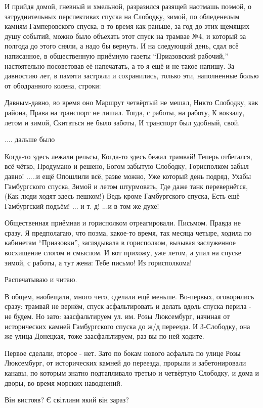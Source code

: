 И прийдя домой, гневный и хмельной, разразился разящей наотмашь поэмой, о
затруднительных перспективах спуска на Слободку, зимой, по обледенелым камням
Гамперовского спуска, в то время как раньше, за год до этих щемящих душу
событий, можно было объехать этот спуск на трамвае №4, и который за полгода до
этого сняли, а надо бы вернуть. И на следующий день, сдал всё написанное, в
общественную приёмную газеты \enquote{Приазовский рабочий,} настоятельно посоветовав
её напечатать, а то я ещё и не такое напишу. За давностию лет, в памяти
застряли и сохранились, только эти, наполненные болью от ободранного колена,
строки:

\obeycr
Давным-давно, во время оно
Маршрут четвёртый не мешал,
Никто Слободку, как района,
Права на транспорт не лишал.
Тогда, с работы, на работу,
К вокзалу, летом и зимой,
Скитаться не было заботы,
И транспорт был удобный, свой.
\restorecr

.... дальше было


\obeycr
Когда-то здесь лежали рельсы,
Когда-то здесь бежал трамвай!
Теперь отбегался, всё чётко,
Продумано и решено,
Богом забытую Слободку,
Горисполком забыл давно!
\smallskip
.....и ещё
\smallskip
Опошлили всё, разве можно,
Уже который день подряд,
Ухабы Гамбургского спуска,
Зимой и летом штурмовать,
Где даже танк перевернётся,
(Как люди ходят здесь пешком!)
Ведь кроме Гамбургского спуска,
Есть ещё Гамбургский подъём!
\smallskip
... и т. д! ...и в том же духе!
\restorecr

Общественная приёмная и горисполком отреагировали. Письмом. Правда не сразу. Я
предполагаю, что поэма, какое-то время, так месяца четыре, ходила по кабинетам
\enquote{Приазовки}, заглядывала в горисполком, вызывая заслуженное восхищение слогом и
смыслом. И вот прихожу, уже летом, а упал на спуске зимой, с работы, а тут
жена: Тебе письмо! Из горисполкома!

Распечатываю и читаю.

В общем, наобещали, много чего, сделали ещё меньше. Во-первых, оговорились
сразу: трамвай не вернём, спуск асфальтировать и делать вдоль спуска перила -
не будем. Но зато: заасфальтируем ул. им. Розы Люксембург, начиная от
исторических камней Гамбургского спуска до ж/д переезда. И 3-Слободку, она же
улица Донецкая, тоже заасфальтируем, раз вы по ней ходите.

Первое сделали, второе - нет. Зато по бокам нового асфальта по улице Розы
Люксембург, от исторических камней до переезда, прорыли и забетонировали
канавы, по которым знатно подтапливало третью и четвёртую Слободку, и дома и
дворы, во время морских наводнений.


Він вистояв? Є світлини який він зараз?
